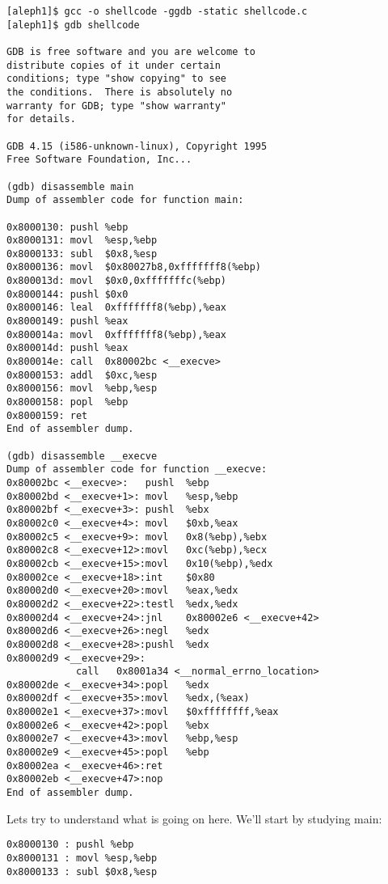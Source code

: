 \documentclass[12pt]{article}
\begin{document}
{\small
\begin{verbatim}
[aleph1]$ gcc -o shellcode -ggdb -static shellcode.c
[aleph1]$ gdb shellcode

GDB is free software and you are welcome to 
distribute copies of it under certain 
conditions; type "show copying" to see 
the conditions.  There is absolutely no 
warranty for GDB; type "show warranty" 
for details.

GDB 4.15 (i586-unknown-linux), Copyright 1995 
Free Software Foundation, Inc...

(gdb) disassemble main
Dump of assembler code for function main:

0x8000130: pushl %ebp
0x8000131: movl  %esp,%ebp
0x8000133: subl  $0x8,%esp
0x8000136: movl  $0x80027b8,0xfffffff8(%ebp)
0x800013d: movl  $0x0,0xfffffffc(%ebp)
0x8000144: pushl $0x0
0x8000146: leal  0xfffffff8(%ebp),%eax
0x8000149: pushl %eax
0x800014a: movl  0xfffffff8(%ebp),%eax
0x800014d: pushl %eax
0x800014e: call  0x80002bc <__execve>
0x8000153: addl  $0xc,%esp
0x8000156: movl  %ebp,%esp
0x8000158: popl  %ebp
0x8000159: ret
End of assembler dump.

(gdb) disassemble __execve
Dump of assembler code for function __execve:
0x80002bc <__execve>:   pushl  %ebp
0x80002bd <__execve+1>: movl   %esp,%ebp
0x80002bf <__execve+3>: pushl  %ebx
0x80002c0 <__execve+4>: movl   $0xb,%eax
0x80002c5 <__execve+9>: movl   0x8(%ebp),%ebx
0x80002c8 <__execve+12>:movl   0xc(%ebp),%ecx
0x80002cb <__execve+15>:movl   0x10(%ebp),%edx
0x80002ce <__execve+18>:int    $0x80
0x80002d0 <__execve+20>:movl   %eax,%edx
0x80002d2 <__execve+22>:testl  %edx,%edx
0x80002d4 <__execve+24>:jnl    0x80002e6 <__execve+42>
0x80002d6 <__execve+26>:negl   %edx
0x80002d8 <__execve+28>:pushl  %edx
0x80002d9 <__execve+29>:
            call   0x8001a34 <__normal_errno_location>
0x80002de <__execve+34>:popl   %edx
0x80002df <__execve+35>:movl   %edx,(%eax)
0x80002e1 <__execve+37>:movl   $0xffffffff,%eax
0x80002e6 <__execve+42>:popl   %ebx
0x80002e7 <__execve+43>:movl   %ebp,%esp
0x80002e9 <__execve+45>:popl   %ebp
0x80002ea <__execve+46>:ret
0x80002eb <__execve+47>:nop
End of assembler dump.
\end{verbatim}
}

Lets try to understand what is going on here.  We'll start by studying main: 

\begin{verbatim}
0x8000130 : pushl %ebp
0x8000131 : movl %esp,%ebp
0x8000133 : subl $0x8,%esp
\end{verbatim}
\end{document}
